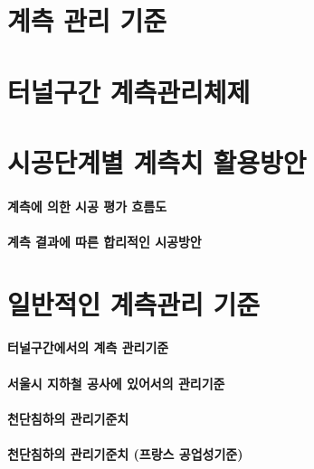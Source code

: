 	\section{계측 관리 기준}
	
	\section{터널구간 계측관리체제}
			
	\section{시공단계별 계측치 활용방안}


		\paragraph{계측에 의한 시공 평가 흐름도}
		
		\paragraph{계측 결과에 따른 합리적인 시공방안}

	\section{일반적인 계측관리 기준}

		\paragraph{터널구간에서의 계측 관리기준}
		
		\paragraph{서울시 지하철 공사에 있어서의 관리기준}
		
		\paragraph{천단침하의 관리기준치}

		\paragraph{천단침하의 관리기준치 (프랑스 공업성기준)}
		
